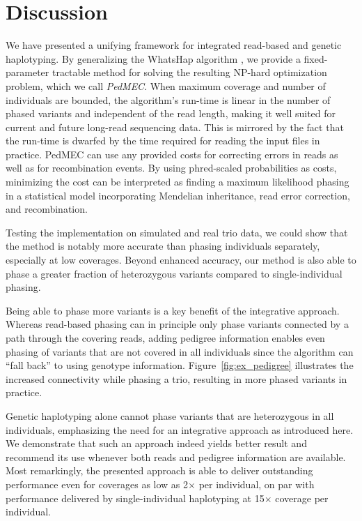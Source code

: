 \section{Discussion}
We have presented a unifying framework for integrated read-based and genetic haplotyping.
By generalizing the WhatsHap algorithm \citep{Patterson2015}, we provide a fixed-parameter tractable method for solving the resulting NP-hard optimization problem, which we call \emph{PedMEC}.
When maximum coverage and number of individuals are bounded, the algorithm's run-time is linear in the number of phased variants and independent of the read length, making it well suited for current and future long-read sequencing data.
This is mirrored by the fact that the run-time is dwarfed by the time required for reading the input files in practice.
PedMEC can use any provided costs for correcting errors in reads as well as for recombination events.
By using phred-scaled probabilities as costs, minimizing the cost can be interpreted as finding a maximum likelihood phasing in a statistical model incorporating Mendelian inheritance, read error correction, and recombination.

Testing the implementation on simulated and real trio data, we could show that the method is notably more accurate than phasing individuals separately, especially at low coverages.
Beyond enhanced accuracy, our method is also able to phase a greater fraction of heterozygous variants compared to single-individual phasing.

Being able to phase more variants is a key benefit of the integrative approach.
Whereas read-based phasing can in principle only phase variants connected by a path through the covering reads, adding pedigree information enables even phasing of variants that are not covered in all individuals since the algorithm can ``fall back'' to using genotype information.
Figure~\ref{fig:ex_pedigree} illustrates the increased connectivity while phasing a trio, resulting in more phased variants in practice.

Genetic haplotyping alone cannot phase variants that are heterozygous in all individuals, emphasizing the need for an integrative approach as introduced here.
We demonstrate that such an approach indeed yields better result and recommend its use whenever both reads and pedigree information are available.
Most remarkingly, the presented approach is able to deliver outstanding performance even for coverages as low as 2$\times$ per individual, on par with performance delivered by single-individual haplotyping at 15$\times$ coverage per individual.


